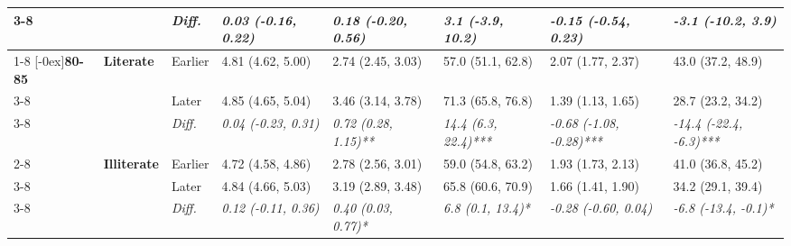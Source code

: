\documentclass[12pt, a4paper]{article}
\begin{document}
\begin{appendices}
\begin{table}[!p]
{\begin{tabular}[t]{>{}l>{}lllllll}
        \cmidrule{3-8}
                                              &                                      & \cellcolor{gray!10}\em{Diff.} & \cellcolor{gray!10}\em{0.03 (-0.16, 0.22)}  & \cellcolor{gray!10}\em{0.18 (-0.20, 0.56)}  & \cellcolor{gray!10}\em{3.1 (-3.9, 10.2)}    & \cellcolor{gray!10}\em{-0.15 (-0.54, 0.23)}     & \cellcolor{gray!10}\em{-3.1 (-10.2, 3.9)}      \\
        \cmidrule{1-8}
        \multirow{9}{*}[-0ex]{\textbf{80-85}} & \multirow{3}{*}{\textbf{Literate}}   & Earlier                       & 4.81 (4.62, 5.00)                           & 2.74 (2.45, 3.03)                           & 57.0 (51.1, 62.8)                           & 2.07 (1.77, 2.37)                               & 43.0 (37.2, 48.9)                              \\
        \cmidrule{3-8}
                                              &                                      & Later                         & 4.85 (4.65, 5.04)                           & 3.46 (3.14, 3.78)                           & 71.3 (65.8, 76.8)                           & 1.39 (1.13, 1.65)                               & 28.7 (23.2, 34.2)                              \\
        \cmidrule{3-8}
                                              &                                      & \cellcolor{gray!10}\em{Diff.} & \cellcolor{gray!10}\em{0.04 (-0.23, 0.31)}  & \cellcolor{gray!10}\em{0.72 (0.28, 1.15)**} & \cellcolor{gray!10}\em{14.4 (6.3, 22.4)***} & \cellcolor{gray!10}\em{-0.68 (-1.08, -0.28)***} & \cellcolor{gray!10}\em{-14.4 (-22.4, -6.3)***} \\
        \cmidrule{2-8}
                                              & \multirow{3}{*}{\textbf{Illiterate}} & Earlier                       & 4.72 (4.58, 4.86)                           & 2.78 (2.56, 3.01)                           & 59.0 (54.8, 63.2)                           & 1.93 (1.73, 2.13)                               & 41.0 (36.8, 45.2)                              \\
        \cmidrule{3-8}
                                              &                                      & Later                         & 4.84 (4.66, 5.03)                           & 3.19 (2.89, 3.48)                           & 65.8 (60.6, 70.9)                           & 1.66 (1.41, 1.90)                               & 34.2 (29.1, 39.4)                              \\
        \cmidrule{3-8}
                                              &                                      & \cellcolor{gray!10}\em{Diff.} & \cellcolor{gray!10}\em{0.12 (-0.11, 0.36)}  & \cellcolor{gray!10}\em{0.40 (0.03, 0.77)*}  & \cellcolor{gray!10}\em{6.8 (0.1, 13.4)*}    & \cellcolor{gray!10}\em{-0.28 (-0.60, 0.04)}     & \cellcolor{gray!10}\em{-6.8 (-13.4, -0.1)*}    \\

\end{tabular}}
\end{table}
\end{appendices}
\end{document}
